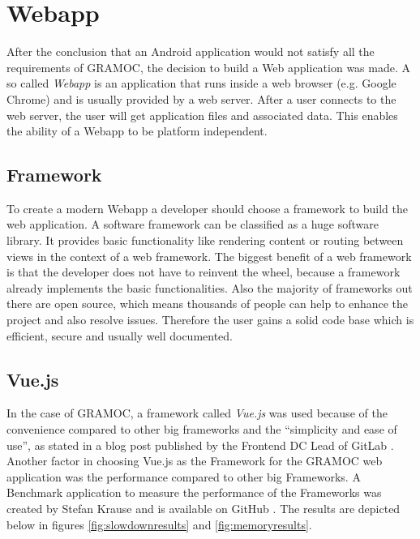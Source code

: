 \chapter{Webapp}
\label{ch:Webapp}

\author{Nico Leidenfrost}
%
After the conclusion that an Android application would not satisfy all the requirements of GRAMOC, the decision to build a Web application was made. A so called \textit{Webapp} is an application that runs inside a web browser (e.g. Google Chrome) and is usually provided by a web server. After a user connects to the web server, the user will get application files and associated data. This enables the ability of a Webapp to be platform independent.

\section{Framework}
To create a modern Webapp a developer should choose a framework to build the web application. A software framework can be classified as a huge software library. It provides basic functionality like rendering content or routing between views in the context of a web framework. The biggest benefit of a web framework is that the developer does not have to reinvent the wheel, because a framework already implements the basic functionalities. Also the majority of frameworks out there are open source, which means thousands of people can help to enhance the project and also resolve issues. Therefore the user gains a solid code base which is efficient, secure and usually well documented.

\section{Vue.js}
In the case of GRAMOC, a framework called \textit{Vue.js} was used because of the convenience compared to other big frameworks and the ``simplicity and ease of use'', as stated in a blog post published by the Frontend DC Lead of GitLab \autocite{Vue, WhyVue, GitLab}. Another factor in choosing Vue.js as the Framework for the GRAMOC web application was the performance compared to other big Frameworks. A Benchmark application to measure the performance of the Frameworks was created by Stefan Krause and is available on GitHub \autocite{FrameworkBenchmark}. The results are depicted below in figures \vref{fig:slowdownresults} and \vref{fig:memoryresults}.

\frameworkdata

